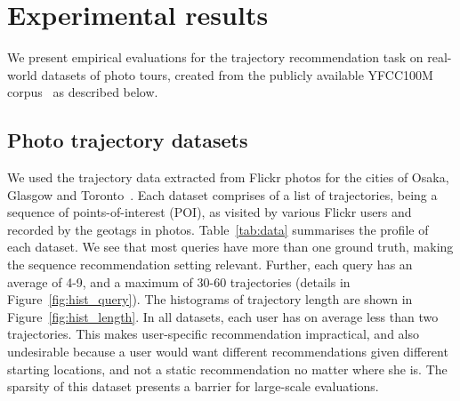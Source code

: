 
\section{Experimental results}
\label{sec:experiment}


We present empirical evaluations for the trajectory recommendation task %
on real-world datasets of photo tours,
created from the publicly available YFCC100M corpus~\cite{thomee2016yfcc100m} as described below.


\subsection{Photo trajectory datasets}
\label{sec:dataset}

We used the trajectory data %
extracted from Flickr photos for the cities of Osaka, Glasgow and Toronto~\cite{ijcai15,cikm16paper,ht10}.
Each dataset comprises of a list of trajectories, being a sequence of points-of-interest (POI),
as visited by various Flickr users and recorded by the geotags in photos.
Table~\ref{tab:data} summarises the profile of each dataset.
We see that most queries have more than one ground truth, making the sequence recommendation setting relevant. Further, each query has an average of 4-9, and a maximum of 30-60 trajectories (details in Figure~\ref{fig:hist_query}).
The histograms of trajectory length are shown in Figure~\ref{fig:hist_length}.
In all datasets,
each user has on average less than two trajectories.
This makes user-specific recommendation impractical, and also undesirable because
a user would want different recommendations given different starting locations, and not a static recommendation no matter where she is.
The sparsity of this dataset presents a barrier for large-scale evaluations.

